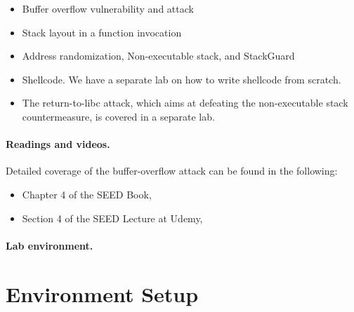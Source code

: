 \begin{itemize}[noitemsep]
\item Buffer overflow vulnerability and attack
\item Stack layout in a function invocation
\item Address randomization, Non-executable stack, and  StackGuard
\item Shellcode. We have a separate lab on how to write shellcode 
from scratch.
\item The return-to-libc attack, which aims at 
defeating the non-executable stack countermeasure, is covered 
in a separate lab.
\end{itemize}


\noindent
{}



\paragraph{Readings and videos.}
Detailed coverage of the buffer-overflow attack can be found in the following:

\begin{itemize}
\item Chapter 4 of the SEED Book, \seedbook
\item Section 4 of the SEED Lecture at Udemy, \seedcsvideo
\end{itemize}


\paragraph{Lab environment.} \seedenvironment



\newpage
\section{Environment Setup}

